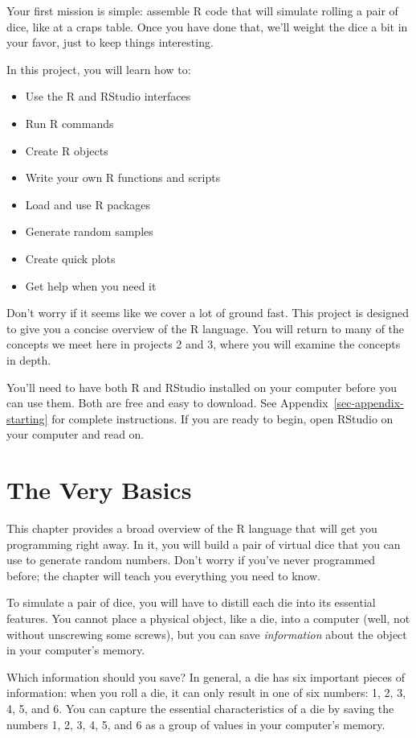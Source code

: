 \documentclass[
  letterpaper,
  DIV=11,
  numbers=noendperiod]{scrbook}
\providecommand{\tightlist}{%
  \setlength{\itemsep}{0pt}\setlength{\parskip}{0pt}}
\begin{document}
Your first mission is simple: assemble R code that will simulate rolling
a pair of dice, like at a craps table. Once you have done that, we'll
weight the dice a bit in your favor, just to keep things interesting.

In this project, you will learn how to:

\begin{itemize}
\tightlist
\item
  Use the R and RStudio interfaces
\item
  Run R commands
\item
  Create R objects
\item
  Write your own R functions and scripts
\item
  Load and use R packages
\item
  Generate random samples
\item
  Create quick plots
\item
  Get help when you need it
\end{itemize}

Don't worry if it seems like we cover a lot of ground fast. This project
is designed to give you a concise overview of the R language. You will
return to many of the concepts we meet here in projects 2 and 3, where
you will examine the concepts in depth.

You'll need to have both R and RStudio installed on your computer before
you can use them. Both are free and easy to download. See
Appendix~\ref{sec-appendix-starting} for complete instructions. If you
are ready to begin, open RStudio on your computer and read on.

\chapter{The Very Basics}\label{sec-basics}

This chapter provides a broad overview of the R language that will get
you programming right away. In it, you will build a pair of virtual dice
that you can use to generate random numbers. Don't worry if you've never
programmed before; the chapter will teach you everything you need to
know.

To simulate a pair of dice, you will have to distill each die into its
essential features. You cannot place a physical object, like a die, into
a computer (well, not without unscrewing some screws), but you can save
\emph{information} about the object in your computer's memory.

Which information should you save? In general, a die has six important
pieces of information: when you roll a die, it can only result in one of
six numbers: 1, 2, 3, 4, 5, and 6. You can capture the essential
characteristics of a die by saving the numbers 1, 2, 3, 4, 5, and 6 as a
group of values in your computer's memory.
\end{document}
